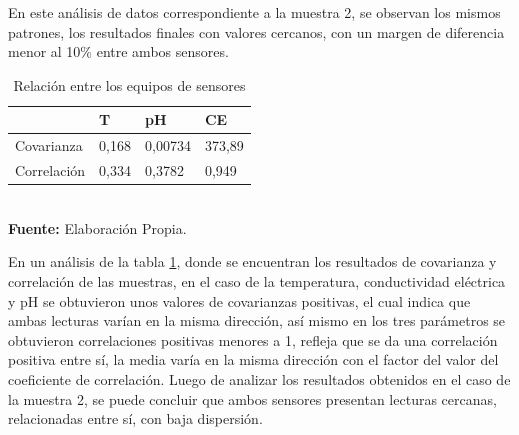 En este an\'alisis de datos correspondiente a la muestra 2, se observan los mismos patrones, los resultados finales con valores cercanos, con un margen de diferencia menor al 10\% entre ambos sensores. 
\begin{table}[H]
\caption{Relaci\'on entre los equipos de sensores}
\label{tab:VaCoM2}
\centering
\begin{tabular}{llll} 
\toprule
& T   &  pH    & CE \\
\midrule
Covarianza  &0,168 & 0,00734 & 373,89        \\
Correlaci\'on & 0,334& 0,3782 & 0,949        \\
\bottomrule
\end{tabular}
\\ \textbf{Fuente: }Elaboración Propia.
\end{table} 
En un an\'alisis de la tabla \ref{tab:VaCoM2}, donde se encuentran los resultados de covarianza y correlación de las muestras, en el caso de la temperatura, conductividad el\'ectrica y pH se obtuvieron unos valores de covarianzas positivas, el cual indica que ambas lecturas varían en la misma dirección, as\'i mismo en los tres par\'ametros se obtuvieron correlaciones positivas menores a 1, refleja que se da una correlación positiva entre sí, la media varía en la misma dirección con el factor del valor del coeficiente de correlación. Luego de analizar los resultados obtenidos en el caso de la muestra 2, se puede concluir que ambos sensores presentan lecturas cercanas, relacionadas entre s\'i, con baja dispersi\'on. 
